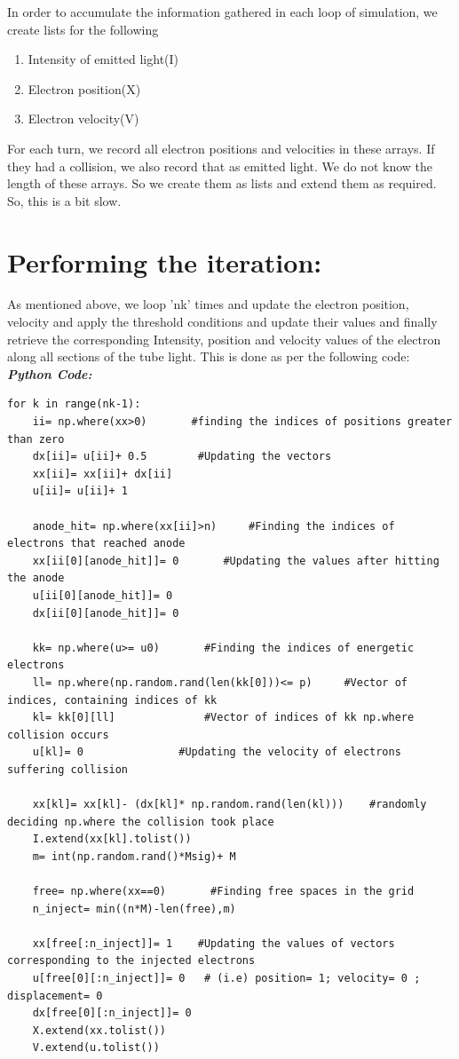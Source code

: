 \documentclass[11pt, a4paper]{article}
\begin{document}
In order to accumulate the information gathered in each loop of simulation, we create lists for the following
\begin{enumerate}
    \item Intensity of emitted light(I)
    \item Electron position(X)
    \item Electron velocity(V)
\end{enumerate}

For each turn, we record all electron positions and velocities in these arrays.  If they had a collision, we also record that as emitted light. We do not know the length of these arrays.  So we create them as lists and extend them as required. So, this is a bit slow.

\section{Performing the iteration:}
As mentioned above, we loop 'nk' times and update the electron position, velocity and apply the threshold conditions and update their values and finally retrieve the corresponding Intensity, position and velocity values of the electron along all sections of the tube light.
This is done as per the following code:
    \textit{\textbf{Python Code:}}
    \lstset{language=Python}
    \lstset{basicstyle=\footnotesize}
    \begin{lstlisting}
for k in range(nk-1):
    ii= np.where(xx>0)       #finding the indices of positions greater than zero
    dx[ii]= u[ii]+ 0.5        #Updating the vectors
    xx[ii]= xx[ii]+ dx[ii]     
    u[ii]= u[ii]+ 1           
    
    anode_hit= np.where(xx[ii]>n)     #Finding the indices of electrons that reached anode
    xx[ii[0][anode_hit]]= 0       #Updating the values after hitting the anode
    u[ii[0][anode_hit]]= 0
    dx[ii[0][anode_hit]]= 0

    kk= np.where(u>= u0)       #Finding the indices of energetic electrons
    ll= np.where(np.random.rand(len(kk[0]))<= p)     #Vector of indices, containing indices of kk  
    kl= kk[0][ll]              #Vector of indices of kk np.where collision occurs
    u[kl]= 0               #Updating the velocity of electrons suffering collision

    xx[kl]= xx[kl]- (dx[kl]* np.random.rand(len(kl)))    #randomly deciding np.where the collision took place
    I.extend(xx[kl].tolist())
    m= int(np.random.rand()*Msig)+ M
    
    free= np.where(xx==0)       #Finding free spaces in the grid
    n_inject= min((n*M)-len(free),m)
    
    xx[free[:n_inject]]= 1    #Updating the values of vectors corresponding to the injected electrons
    u[free[0][:n_inject]]= 0   # (i.e) position= 1; velocity= 0 ; displacement= 0
    dx[free[0][:n_inject]]= 0         
    X.extend(xx.tolist())
    V.extend(u.tolist())
    \end{lstlisting}
\end{document}
